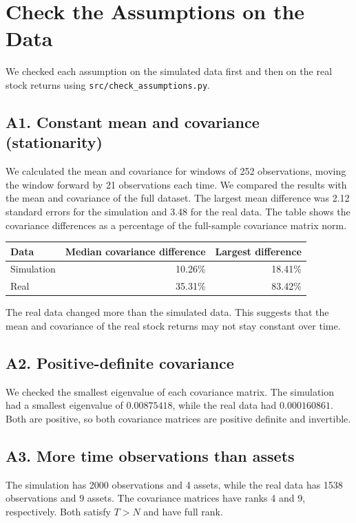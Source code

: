 \documentclass[11pt]{article}
\begin{document}
\section{Check the Assumptions on the Data}
We checked each assumption on the simulated data first and then on
the real stock returns using \texttt{src/check\_assumptions.py}.

\subsection*{A1. Constant mean and covariance (stationarity)}
We calculated the mean and covariance for windows of 252 observations,
moving the window forward by 21 observations each time. We compared
the results with the mean and covariance of the full dataset.
The largest mean difference was 2.12 standard errors for the
simulation and 3.48 for the real data. The table shows the
covariance differences as a percentage of the full-sample
covariance matrix norm.

\begin{center}
\begin{tabular}{@{}lrr@{}}
\toprule
Data & Median covariance difference & Largest difference\\
\midrule
Simulation & 10.26\% & 18.41\%\\
Real & 35.31\% & 83.42\%\\
\bottomrule
\end{tabular}
\end{center}

The real data changed more than the simulated data. This suggests
that the mean and covariance of the real stock returns may not
stay constant over time.

\subsection*{A2. Positive-definite covariance}
We checked the smallest eigenvalue of each covariance matrix.
The simulation had a smallest eigenvalue of $0.00875418$, while
the real data had $0.000160861$. Both are positive, so both
covariance matrices are positive definite and invertible.

\subsection*{A3. More time observations than assets}
The simulation has 2000 observations and 4 assets, while the real
data has 1538 observations and 9 assets. The covariance matrices
have ranks 4 and 9, respectively. Both satisfy $T>N$ and have
full rank.
\end{document}
